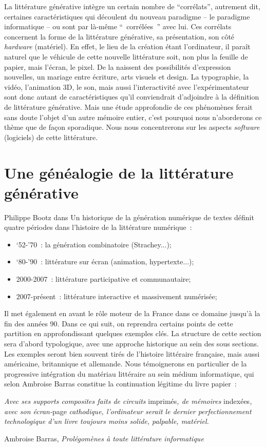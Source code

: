 \documentclass{article}
\newenvironment{citationbox}
{\begin{center}
		\begin{minipage}{.8\textwidth}
		}
		{
		\end{minipage}	
\end{center}
}
\begin{document}
			La littérature générative intègre un certain nombre de ``corrélats'', autrement dit, certaines caractéristiques qui découlent du nouveau paradigme -- le paradigme informatique -- ou sont par là-même `` corrélées '' avec lui. Ces corrélats concernent la forme de la littérature générative, sa présentation, son côté \textit{hardware} (matériel). En effet, le lieu de la création étant l'ordinateur, il paraît naturel que le véhicule de cette nouvelle littérature soit, non plus la feuille de papier, mais l'écran, le pixel. De la naissent des possibilités d'expression nouvelles, un mariage entre écriture, arts visuels et design. La typographie, la vidéo, l'animation 3D, le son, mais aussi l'interactivité avec l'expérimentateur sont donc autant de caractéristiques qu'il conviendrait d'adjoindre à la définition de littérature générative. Mais une étude approfondie de ces phénomènes ferait sans doute l'objet d'un autre mémoire entier, c'est pourquoi nous n'aborderons ce thème que de façon sporadique. Nous nous concentrerons sur les aspects \textit{software} (logiciels) de cette littérature.
		
	\section{Une généalogie de la littérature générative}\label{genealogie}
		Philippe Bootz dans Un historique de la génération numérique de textes définit quatre périodes dans l'histoire de la littérature numérique :
		\begin{itemize}
			\item ‘52-'70 : la génération combinatoire (Strachey...);
			\item ‘80-'90 : littérature sur écran (animation, hypertexte...);
			\item 2000-2007 : littérature participative et communautaire;
			\item 2007-présent : littérature interactive et massivement numérisée;
		\end{itemize}
		Il met également en avant le rôle moteur de la France dans ce domaine jusqu'à la fin des années 90. Dans ce qui suit, on reprendra certains points de cette partition en approfondissant quelques exemples clés. La structure de cette section sera d'abord typologique, avec une approche historique au sein des sous sections. Les exemples seront  bien souvent tirés de l'histoire littéraire française, mais aussi américaine, britannique et allemande. Nous témoignerons en particulier de la progressive intégration du matériau littéraire au sein médium informatique, qui selon Ambroise Barras constitue la continuation légitime du livre papier~:
		\begin{citationbox}
			\textit{Avec ses
			supports composites faits de circuits} imprimés\textit{, de mémoires }indexées\textit{,
			avec son écran-}page \textit{cathodique, l'ordinateur serait le dernier
			perfectionnement technologique d'un livre toujours moins solide, palpable,
			matériel.}
			\begin{flushright}
				Ambroise Barras, \textit{Prolégomènes à toute littérature informatique} \cite{barras1995}
			\end{flushright}
		\end{citationbox}
		
\end{document}
